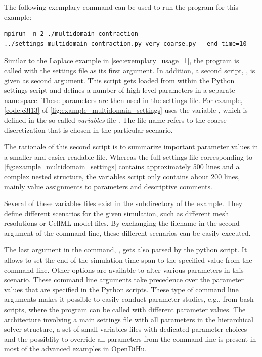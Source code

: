 The following exemplary command can be used to run the program for this example:
\begin{lstlisting}[columns=fullflexible,breaklines=true,postbreak=\mbox{\textcolor{gray}{$\hookrightarrow$}\space}]
  mpirun -n 2 ./multidomain_contraction ../settings_multidomain_contraction.py very_coarse.py --end_time=10
\end{lstlisting}
Similar to the Laplace example in \cref{sec:exemplary_usage_1}, the program  is called with the settings file  as its first argument. In addition, a second script, , is given as second argument. This script gets loaded from within the Python settings script and defines a number of high-level parameters in a separate  namespace. These parameters are then used in the settings file. For example, \cref{code:c3l13} of \cref{fig:example_multidomain_settings} uses the variable , which is defined in the so called \emph{variables} file . The file name refers to the coarse discretization that is chosen in the particular scenario.

The rationale of this second script is to summarize important parameter values in a smaller and easier readable file. Whereas the full settings file corresponding to \cref{fig:example_multidomain_settings} contains approximately 500 lines and a complex nested structure, the variables script only contains about 200 lines, mainly value assignments to parameters and descriptive comments. 

Several of these variables files exist in the  subdirectory of the example. They define different scenarios for the given simulation, such as different mesh resolutions or CellML model files. By exchanging the filename in the second argument of the command line, these different scenarios can be easily executed.

The last argument in the command, , gets also parsed by the python script. It allows to set the end of the simulation time span to the specified value from the command line. Other options are available to alter various parameters in this scenario. These command line arguments take precedence over the parameter values that are specified in the Python scripts. These type of command line arguments makes it possible to easily conduct parameter studies, e.g., from bash scripts, where the program can be called with different parameter values.
The architecture involving a main settings file with all parameters in the hierarchical solver structure, a set of small variables files with dedicated parameter choices and the possiblity to override all parameters from the command line is present in most of the advanced examples in OpenDiHu.

